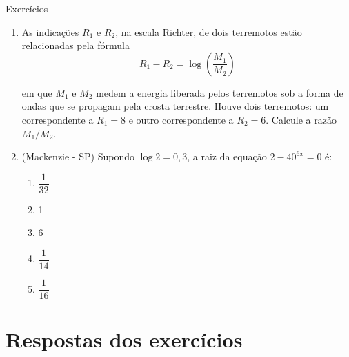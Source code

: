 \documentclass[14pt, aspectratio=169]{beamer}
\newcommand{\skipframe}{\vspace{10.0cm}}
\newcommand{\parenthesis}[1]{\left( #1 \right)}
\begin{document}
\begin{frame}[allowframebreaks]{Exercícios}
\begin{enumerate}
        \skipframe

        \item \cite{fme02} As indicações $R_1$ e $R_2$, na escala Richter, de dois terremotos estão relacionadas pela fórmula
        \begin{equation*}
            R_1 - R_2 = \log \parenthesis{\dfrac{M_1}{M_2}}
        \end{equation*}

        em que $M_1$ e $M_2$ medem a energia liberada pelos terremotos sob a forma de ondas que se propagam pela crosta terrestre. Houve dois terremotos: um correspondente a $R_1 = 8$ e outro correspondente a $R_2 = 6$. Calcule a razão $M_1 / M_2$.

        \skipframe

        \item (Mackenzie - SP) Supondo $\log 2 = 0,3$, a raiz da equação $2 - 40^{6x} = 0$ é:

        \begin{multicols}{2}
            \begin{enumerate}[a]
                \item $\dfrac{1}{32}$
                \item 1
                \item 6 
                \item $\dfrac{1}{14}$
                \item $\dfrac{1}{16}$
            \end{enumerate}
        \end{multicols}
        
        
    \end{enumerate}
\end{frame}

\section{Respostas dos exercícios}
\end{document}
